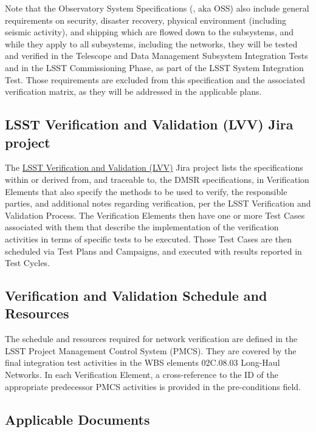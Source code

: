 \documentclass[DM,lsstdraft,STS,toc]{lsstdoc}
\begin{document}
Note that the Observatory System Specifications (, aka OSS) also include general requirements on security, disaster recovery, physical environment (including seismic activity), and shipping which are flowed down to the subsystems, and while they apply to all subsystems, including the networks, they will be tested and verified in the Telescope and Data Management Subsystem Integration Tests and in the LSST Commissioning Phase, as part of the LSST System Integration Test.
Those requirements are excluded from this specification and the associated verification matrix, as they will be addressed in the applicable plans.

\subsection{LSST Verification and Validation (LVV) Jira project}\label{sec:lvv}

The \href{https://jira.lsstcorp.org/projects/LVV/}{LSST Verification and Validation (LVV)} Jira project lists the specifications within or derived from, and traceable to, the DMSR specifications, in Verification Elements that also specify the methods to be used to verify, the responsible parties, and additional notes regarding verification, per the  LSST Verification and Validation Process.
The Verification Elements then have one or more Test Cases associated with them that describe the implementation of the verification activities in terms of specific tests to be executed.
Those Test Cases are then scheduled via Test Plans and Campaigns, and executed with results reported in Test Cycles.

\subsection{Verification and Validation Schedule and Resources}\label{sec:schedule}

The schedule and resources required for network verification are defined in the LSST Project Management Control System (PMCS).
They are covered by the final integration test activities in the WBS elements 02C.08.03 Long-Haul Networks.
In each Verification Element, a cross-reference to the ID of the appropriate predecessor PMCS activities is provided in the pre-conditions field.


\subsection{Applicable Documents}
\label{sec:docs}
\end{document}
